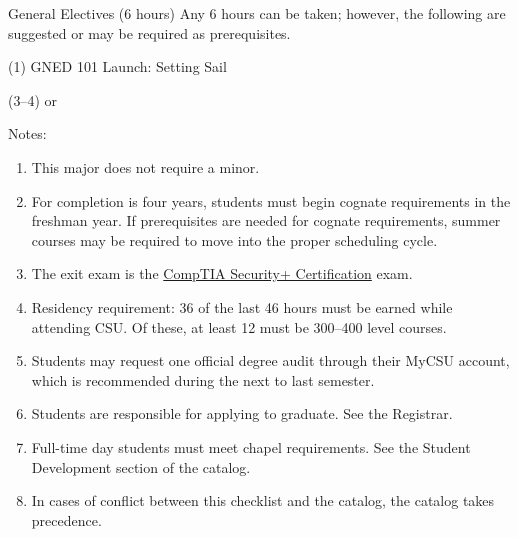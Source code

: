 \begin{reqgroup}{General Electives (6 hours)}
Any 6 hours can be taken; however, the following are suggested or may be required as prerequisites.
\begin{checklist}
\begin{minipage}[t]{\linewidth}
	\item (1)	GNED 101	Launch: Setting Sail
	\item (3--4)	 or %
		\blankReq{}
\end{minipage}
\end{checklist}
\end{reqgroup}

Notes:%
\begin{enumerate}\footnotesize
	\item This major does not require a minor.
	\item For completion is four years, students must begin cognate requirements in the freshman year. If prerequisites are needed for cognate requirements, summer courses may be required to move into the proper scheduling cycle.
	\item\label{note:ba-cyber:exit-exam} The exit exam is the \href{https://www.comptia.org/certifications/security}{CompTIA Security+ Certification} exam.
	\item Residency requirement: 36 of the last 46 hours must be earned while attending CSU\@. Of these, at least 12 must be 300--400 level courses.
	\item Students may request one official degree audit through their MyCSU account, which is recommended during the next to last semester.
	\item Students are responsible for applying to graduate. See the Registrar.
	\item Full-time day students must meet chapel requirements. See the Student Development section of the catalog.
	\item In cases of conflict between this checklist and the catalog, the catalog takes precedence.
\end{enumerate}
